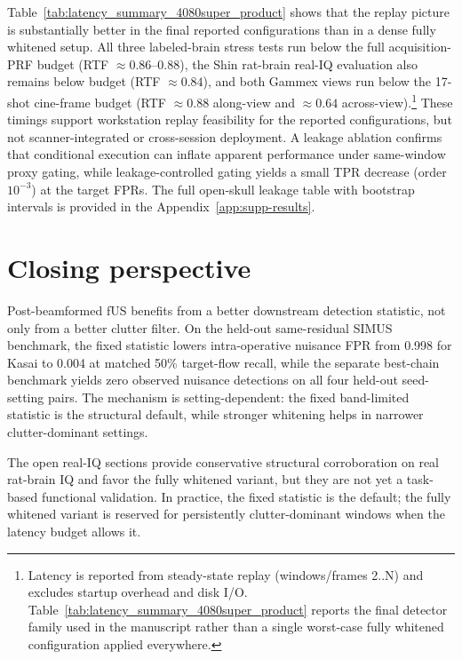\documentclass[11pt]{article}
\newif\ifPAPERONLY
\newcommand{\SuppOrApp}[1]{\ifPAPERONLY Supplementary Material\else Appendix~\ref{#1}\fi}
\begin{document}


Table~\ref{tab:latency_summary_4080super_product} shows that the replay picture is substantially better in the final reported configurations than in a dense fully whitened setup. All three labeled-brain stress tests run below the full acquisition-PRF budget (RTF $\approx 0.86$--$0.88$), the Shin rat-brain real-IQ evaluation also remains below budget (RTF $\approx 0.84$), and both Gammex views run below the 17-shot cine-frame budget (RTF $\approx 0.88$ along-view and $\approx 0.64$ across-view).\footnote{Latency is reported from steady-state replay (windows/frames 2..N) and excludes startup overhead and disk I/O. Table~\ref{tab:latency_summary_4080super_product} reports the final detector family used in the manuscript rather than a single worst-case fully whitened configuration applied everywhere.} These timings support workstation replay feasibility for the reported configurations, but not scanner-integrated or cross-session deployment.
A leakage ablation confirms that conditional execution can inflate apparent performance under same-window proxy gating, while leakage-controlled gating yields a small TPR decrease (order $10^{-3}$) at the target FPRs. The full open-skull leakage table with bootstrap intervals is provided in the \SuppOrApp{app:supp-results}.
\fi

\FloatBarrier
\ifPAPERONLY
\section{Closing perspective}
\label{sec:discussion}

Post-beamformed fUS benefits from a better downstream detection statistic, not only from a better clutter filter. On the held-out same-residual SIMUS benchmark, the fixed statistic lowers intra-operative nuisance FPR from 0.998 for Kasai to 0.004 at matched 50\% target-flow recall, while the separate best-chain benchmark yields zero observed nuisance detections on all four held-out seed-setting pairs. The mechanism is setting-dependent: the fixed band-limited statistic is the structural default, while stronger whitening helps in narrower clutter-dominant settings.

The open real-IQ sections provide conservative structural corroboration on real rat-brain IQ and favor the fully whitened variant, but they are not yet a task-based functional validation. In practice, the fixed statistic is the default; the fully whitened variant is reserved for persistently clutter-dominant windows when the latency budget allows it.
\end{document}
